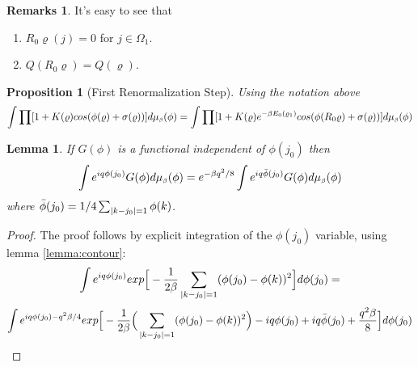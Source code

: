 \documentclass[11pt,reqno]{article}
\DeclarePairedDelimiter\abs{\lvert}{\rvert}%
\newtheorem{lemma}[thm]{Lemma}
\newtheorem{prop}[thm]{Proposition}
\theoremstyle{definition}
\newtheorem*{remarks}{Remarks}
\numberwithin{equation}{section}
\begin{document}
\begin{remarks}
It's easy to see that
\begin{enumerate}
\item $R_0\varrho(j) = 0$ for $j\in\Omega_1$.
\item $Q(R_0\varrho) = Q(\varrho)$.
\end{enumerate}
\end{remarks}


\begin{prop}[First Renormalization Step] \label{prop:lem418}
Using the notation above
$$
\int \prod [1+K(\varrho)cos(\phi(\varrho) + \sigma(\varrho))] d\mu_{\text{\tiny$\beta$}}(\phi) = 
\int \prod [1+K(\varrho)e^{-\beta E_0(\varrho_1)}cos(\phi(R_0\varrho) + \sigma(\varrho))] d\mu_{\text{\tiny$\beta$}}(\phi)
$$
\end{prop}


\begin{lemma} \label{lemma:lem42}
If $G(\phi)$ is a functional independent of $\phi(j_0)$ then
\begin{equation}
\int e^{i q \phi(j_0)} G(\phi)d\mu_{\text{\tiny$\beta$}}(\phi) = e^{-\beta q^2/8} \int e^{i q \bar{\phi}(j_0)} G(\phi)d\mu_{\text{\tiny$\beta$}}(\phi)
\end{equation}
where $\bar{\phi}(j_0)=1/4\sum_{\abs{k-j_0}=1} \phi(k)$.
\end{lemma}
\begin{proof}
The proof follows by explicit integration of the $\phi(j_0)$ variable, using lemma \eqref{lemma:contour}:
$$
\int e^{i q \phi(j_0)} exp \Big[ -\frac{1}{2\beta} \sum_{\abs{k-j_0}=1}(\phi(j_0)-\phi(k))^2 \Big] d\phi(j_0) =
$$
$$
\int e^{i q \phi(j_0) - q^2\beta/4} exp \Big[ -\frac{1}{2\beta} \Big( \sum_{\abs{k-j_0}=1}(\phi(j_0)-\phi(k))^2 \Big) - i q \phi(j_0) + iq\bar{\phi}(j_0) + \frac{q^2\beta}{8}\Big] d\phi(j_0)
$$
\end{proof}
\end{document}
